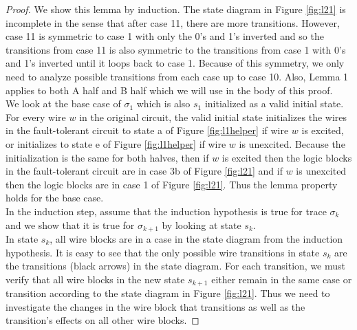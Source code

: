 \documentclass[12pt]{report}
\begin{document}
\begin{proof}
We show this lemma by induction.  The state diagram in Figure \ref{fig:l21} is incomplete in the sense that after case 11, there are more transitions.  However, case 11 is symmetric to case 1 with only the 0's and 1's inverted and so the transitions from case 11 is also symmetric to the transitions from case 1 with 0's and 1's inverted until it loops back to case 1.  Because of this symmetry, we only need to analyze possible transitions from each case up to case 10.  Also, Lemma 1 applies to both A half and B half which we will use in the body of this proof.\\

We look at the base case of $\sigma_1$ which is also $s_1$ initialized as a valid initial state.  For every wire $w$ in the original circuit, the valid initial state initializes the wires in the fault-tolerant circuit to state a of Figure \ref{fig:l1helper} if wire $w$ is excited, or initializes to state e of Figure \ref{fig:l1helper} if wire $w$ is unexcited.  Because the initialization is the same for both halves, then if $w$ is excited then the logic blocks in the fault-tolerant circuit are in case 3b of Figure \ref{fig:l21} and if $w$ is unexcited then the logic blocks are in case 1 of Figure \ref{fig:l21}.  Thus the lemma property holds for the base case. \\

In the induction step, assume that the induction hypothesis is true for trace $\sigma_k$ and we show that it is true for $\sigma_{k+1}$ by looking at state $s_k$.  \\

In state $s_k$, all wire blocks are in a case in the state diagram from the induction hypothesis.  It is easy to see that the only possible wire transitions in state $s_k$ are the transitions (black arrows) in the state diagram.  
For each transition, we must verify that all wire blocks in the new state $s_{k+1}$ either remain in the same case or transition according to the state diagram in Figure \ref{fig:l21}.  Thus we need to investigate the changes in the wire block that transitions as well as the transition's effects on all other wire blocks. 


\end{proof}
\end{document}
